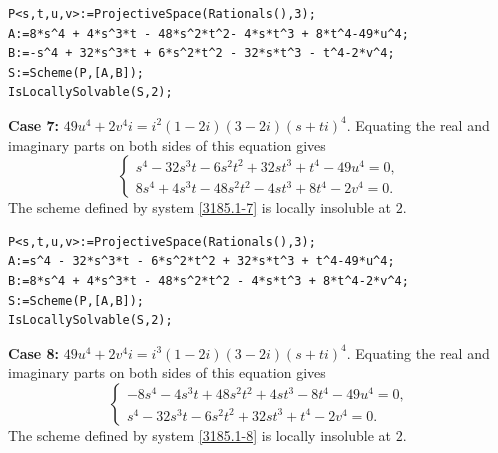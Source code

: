 \documentclass[a4paper,12pt,english,reqno]{amsart}
\begin{document}
\begin{lstlisting}
P<s,t,u,v>:=ProjectiveSpace(Rationals(),3);
A:=8*s^4 + 4*s^3*t - 48*s^2*t^2- 4*s*t^3 + 8*t^4-49*u^4;
B:=-s^4 + 32*s^3*t + 6*s^2*t^2 - 32*s*t^3 - t^4-2*v^4;
S:=Scheme(P,[A,B]);
IsLocallySolvable(S,2);
\end{lstlisting}

{\bf Case 7:} $49u^4+2v^4i=i^2(1-2i)(3-2i)(s+ti)^4$. Equating the real and imaginary parts on both sides of this equation gives
\begin{equation}\label{3185.1-7}
\begin{cases}
s^4 - 32s^3t - 6s^2t^2 + 32st^3 + t^4 - 49u^4=0,\\
8s^4 + 4s^3t - 48s^2t^2 - 4st^3 + 8t^4 - 2v^4=0.
\end{cases}
\end{equation}
The scheme defined by system \eqref{3185.1-7} is locally insoluble at $2$.


\begin{lstlisting}
P<s,t,u,v>:=ProjectiveSpace(Rationals(),3);
A:=s^4 - 32*s^3*t - 6*s^2*t^2 + 32*s*t^3 + t^4-49*u^4;
B:=8*s^4 + 4*s^3*t - 48*s^2*t^2 - 4*s*t^3 + 8*t^4-2*v^4;
S:=Scheme(P,[A,B]);
IsLocallySolvable(S,2);
\end{lstlisting}

{\bf Case 8:} $49u^4+2v^4i=i^3(1-2i)(3-2i)(s+ti)^4$. Equating the real and imaginary parts on both sides of this equation gives
\begin{equation}\label{3185.1-8}
\begin{cases}
-8s^4 - 4s^3t + 48s^2t^2 + 4st^3 - 8t^4 - 49u^4=0,\\
s^4 - 32s^3t - 6s^2t^2 + 32st^3 + t^4 - 2v^4=0.
\end{cases}
\end{equation}
The scheme defined by system \eqref{3185.1-8} is locally insoluble at $2$.
\end{document}
